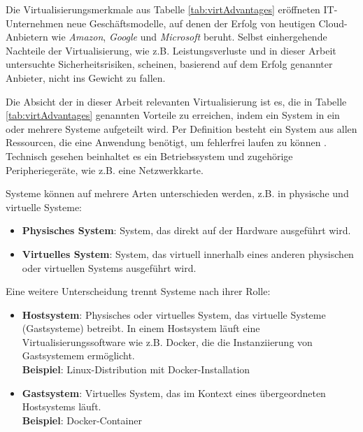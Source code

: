 \documentclass[../main.tex]{subfiles}
\begin{document}
		Die Virtualisierungsmerkmale aus Tabelle \ref{tab:virtAdvantages} eröffneten IT-Unternehmen neue Geschäftsmodelle, auf denen der Erfolg von heutigen Cloud-Anbietern wie \emph{Amazon}, \emph{Google} und \emph{Microsoft} beruht. Selbst einhergehende Nachteile der Virtualisierung, wie z.B. Leistungsverluste und in dieser Arbeit untersuchte Sicherheitsrisiken, scheinen, basierend auf dem Erfolg genannter Anbieter, nicht ins Gewicht zu fallen.


		Die Absicht der in dieser Arbeit relevanten Virtualisierung ist es, die in Tabelle \ref{tab:virtAdvantages} genannten Vorteile zu erreichen, indem ein System in ein oder mehrere Systeme aufgeteilt wird. Per Definition besteht ein System aus allen Ressourcen, die eine Anwendung benötigt, um fehlerfrei laufen zu können \cite[S.106]{tanenbaumOS}. Technisch gesehen beinhaltet es ein Betriebssystem und zugehörige Peripheriegeräte, wie z.B. eine Netzwerkkarte.

		Systeme können auf mehrere Arten unterschieden werden, z.B. in physische und virtuelle Systeme:

		\begin{itemize}
			\item \textbf{Physisches System}: System, das direkt auf der Hardware ausgeführt wird.
			\item \textbf{Virtuelles System}: System, das virtuell innerhalb eines anderen physischen oder virtuellen Systems ausgeführt wird.
		\end{itemize}

		Eine weitere Unterscheidung trennt Systeme nach ihrer Rolle:

		\begin{itemize}
			\item \textbf{Hostsystem}: Physisches oder virtuelles System, das virtuelle Systeme (Gastsysteme) betreibt. In einem Hostsystem läuft eine Virtualisierungssoftware wie z.B. Docker, die die Instanziierung von Gastsystemem ermöglicht.\\
			\textbf{Beispiel}: Linux-Distribution mit Docker-Installation
			\item \textbf{Gastsystem}: Virtuelles System, das im Kontext eines übergeordneten Hostsystems läuft.\\
			\textbf{Beispiel}: Docker-Container
		\end{itemize}
\end{document}
